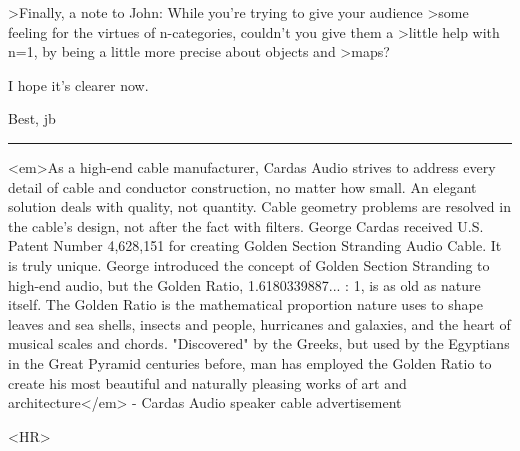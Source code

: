 >Finally, a note to John: While you're trying to give your audience
>some feeling for the virtues of n-categories, couldn't you give them a
>little help with n=1, by being a little more precise about objects and
>maps?

I hope it's clearer now.   

Best,
jb
$$
    

\par\noindent\rule{\textwidth}{0.4pt}
<em>As a high-end cable manufacturer, Cardas Audio strives to address every 
detail of cable and conductor construction, no matter how small.  An 
elegant solution deals with quality, not quantity.  Cable geometry problems 
are resolved in the cable's design, not after the fact with filters.  George 
Cardas received U.S. Patent Number 4,628,151 for creating Golden Section 
Stranding Audio Cable.  It is truly unique.  George introduced the concept 
of Golden Section Stranding to high-end audio, but the Golden Ratio, 
1.6180339887... : 1, is as old as nature itself.  The Golden Ratio is the 
mathematical proportion nature uses to shape leaves and sea shells, insects 
and people, hurricanes and galaxies, and the heart of musical scales and 
chords.  "Discovered" by the Greeks, but used by the Egyptians in the Great
Pyramid centuries before, man has employed the Golden Ratio to create his 
most beautiful and naturally pleasing works of art and architecture</em> - 
Cardas Audio speaker cable advertisement


<HR>



